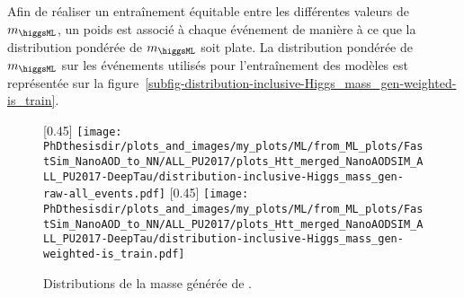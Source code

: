 \par
Afin de réaliser un entraînement équitable entre les différentes valeurs de $m_{\higgsML}$, un poids est associé à chaque événement de manière à ce que la distribution pondérée de $m_{\higgsML}$ soit plate.
La distribution pondérée de $m_{\higgsML}$ sur les événements utilisés pour l'entraînement des modèles est représentée sur la figure~\ref{subfig-distribution-inclusive-Higgs_mass_gen-weighted-is_train}.
\begin{figure}[h]
\centering

[0.45\textwidth]
{\texttt{[image: \\PhDthesisdir/plots\_and\_images/my\_plots/ML/from\_ML\_plots/FastSim\_NanoAOD\_to\_NN/ALL\_PU2017/plots\_Htt\_merged\_NanoAODSIM\_ALL\_PU2017-DeepTau/distribution-inclusive-Higgs\_mass\_gen-raw-all\_events.pdf]}}
\hfill
{}[0.45\textwidth]
{\texttt{[image: \\PhDthesisdir/plots\_and\_images/my\_plots/ML/from\_ML\_plots/FastSim\_NanoAOD\_to\_NN/ALL\_PU2017/plots\_Htt\_merged\_NanoAODSIM\_ALL\_PU2017-DeepTau/distribution-inclusive-Higgs\_mass\_gen-weighted-is\_train.pdf]}}

\caption[Distributions de la masse générée de \higgsML.]{Distributions de la masse générée de \higgsML.}
\label{fig-distribution-inclusive-Higgs_mass_gen-raw-all_events}
\end{figure}